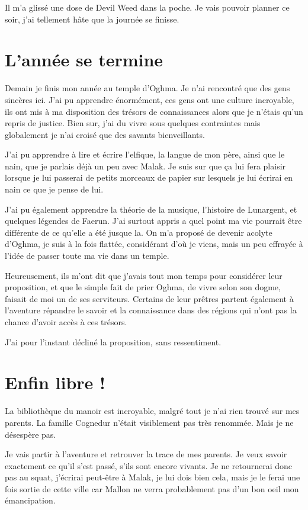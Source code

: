 \documentclass[10pt,a4paper,twoside,twocolumn,openany]{book}
\begin{document}
Il m'a glissé une dose de Devil Weed dans la poche. Je vais pouvoir planner ce soir, j'ai tellement hâte que la journée 
se finisse.

\section{L'année se termine}
Demain je finis mon année au temple d'Oghma. Je n'ai rencontré que des gens sincères ici.
J'ai pu apprendre énormément, ces gens ont une culture incroyable, ils ont mis à ma 
disposition des trésors de connaissances alors que je n'étais qu'un repris de justice.
Bien sur, j'ai du vivre sous quelques contraintes mais globalement je n'ai croisé
que des savants bienveillants.

J'ai pu apprendre à lire et écrire l'elfique, la langue de mon père, ainsi que le nain, que je parlais
déjà un peu avec Malak. Je suis sur que ça lui fera plaisir lorsque je lui passerai de petits morceaux
de papier sur lesquels je lui écrirai en nain ce que je pense de lui.

J'ai pu également apprendre la théorie de la musique, l'histoire de Lunargent, et quelques légendes
de Faerun.
J'ai surtout appris a quel point ma vie pourrait être différente de ce qu'elle a été
jusque la. On m'a proposé de devenir acolyte d'Oghma, je suis à la fois flattée, considérant
d'où je viens, mais un peu effrayée à l'idée de passer toute ma vie dans un temple.

Heureusement, ils m'ont dit que j'avais tout mon temps pour considérer leur proposition, et que le
simple fait de prier Oghma, de vivre selon son dogme, faisait de moi un de ses serviteurs.
Certains de leur prêtres partent également à l'aventure répandre le savoir et la connaissance
dans des régions qui n'ont pas la chance d'avoir accès à ces trésors.

J'ai pour l'instant décliné la proposition, sans ressentiment.

\section{Enfin libre !}

La bibliothèque du manoir est incroyable, malgré tout je n'ai rien trouvé sur mes parents. 
La famille Cognedur n'était visiblement pas très renommée. Mais je ne désespère pas.

Je vais partir à l'aventure et retrouver la trace de mes parents. Je veux savoir exactement
ce qu'il s'est passé, s'ils sont encore vivants. Je ne retournerai donc pas au squat, j'écrirai
peut-être à Malak, je lui dois bien cela, mais je le ferai une fois sortie de cette ville car
Mallon ne verra probablement pas d'un bon oeil mon émancipation.
\end{document}
